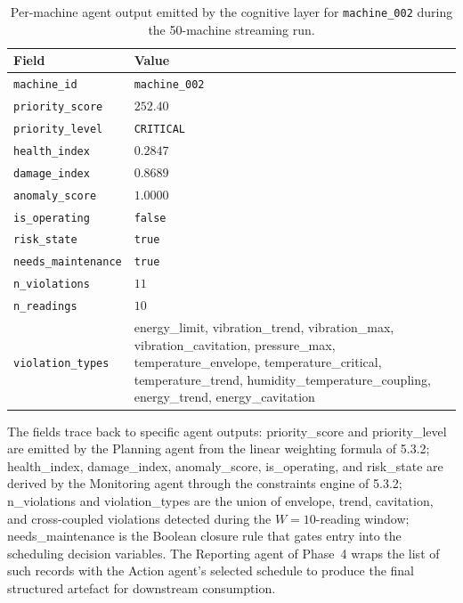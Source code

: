 \begin{table}[!htbp]
\centering
\caption{Per-machine agent output emitted by the cognitive layer for \texttt{machine\_002} during the 50-machine streaming run.}
\label{tab:agent_state_example}
\small
\renewcommand{\arraystretch}{1.25}
\begin{tabular}{@{}l p{7.3cm}@{}}
\toprule
\textbf{Field} & \textbf{Value} \\
\midrule
\texttt{machine\_id}        & \texttt{machine\_002} \\
\texttt{priority\_score}    & $252.40$ \\
\texttt{priority\_level}    & \texttt{CRITICAL} \\
\texttt{health\_index}      & $0.2847$ \\
\texttt{damage\_index}      & $0.8689$ \\
\texttt{anomaly\_score}     & $1.0000$ \\
\texttt{is\_operating}      & \texttt{false} \\
\texttt{risk\_state}        & \texttt{true} \\
\texttt{needs\_maintenance} & \texttt{true} \\
\texttt{n\_violations}      & $11$ \\
\texttt{n\_readings}        & $10$ \\
\texttt{violation\_types}   & energy\_limit, vibration\_trend, vibration\_max, vibration\_cavitation, pressure\_max, temperature\_envelope, temperature\_critical, temperature\_trend, humidity\_temperature\_coupling, energy\_trend, energy\_cavitation \\
\bottomrule
\end{tabular}
\end{table}

The fields trace back to specific agent outputs: priority\_score and priority\_level are emitted by the Planning agent from the linear weighting formula of 5.3.2; health\_index, damage\_index, anomaly\_score, is\_operating, and risk\_state are derived by the Monitoring agent through the constraints engine of 5.3.2; n\_violations and violation\_types are the union of envelope, trend, cavitation, and cross-coupled violations detected during the $W=10$-reading window; needs\_maintenance is the Boolean closure rule that gates entry into the scheduling decision variables. The Reporting agent of Phase~4 wraps the list of such records with the Action agent's selected schedule to produce the final structured artefact for downstream consumption.